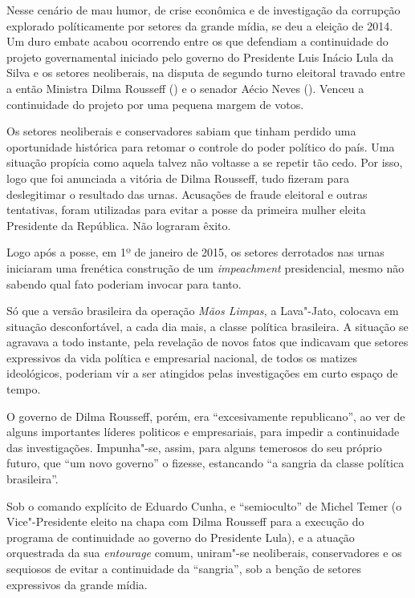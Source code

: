 Nesse cenário de mau humor, de crise econômica e de investigação da
corrupção explorado políticamente por setores da grande mídia, se deu a
eleição de 2014. Um duro embate acabou ocorrendo entre os que defendiam
a continuidade do projeto governamental iniciado pelo governo do
Presidente Luis Inácio Lula da Silva e os setores neoliberais, na
disputa de segundo turno eleitoral travado entre a então Ministra Dilma
Rousseff () e o senador Aécio Neves (). Venceu a continuidade do
projeto por uma pequena margem de votos.

Os setores neoliberais e conservadores sabiam que tinham perdido uma
oportunidade histórica para retomar o controle do poder político do
país. Uma situação propícia como aquela talvez não voltasse a se repetir
tão cedo. Por isso, logo que foi anunciada a vitória de Dilma Rousseff,
tudo fizeram para deslegitimar o resultado das urnas. Acusações de
fraude eleitoral e outras tentativas, foram utilizadas para evitar a
posse da primeira mulher eleita Presidente da República. Não lograram
êxito.

Logo após a posse, em 1º de janeiro de 2015, os setores derrotados nas
urnas iniciaram uma frenética construção de um \emph{impeachment}
presidencial, mesmo não sabendo qual fato poderiam invocar para tanto.

Só que a versão brasileira da operação \emph{Mãos Limpas,} a
Lava"-Jato, colocava em situação desconfortável, a cada dia
mais, a classe política brasileira. A situação se agravava a todo
instante, pela revelação de novos fatos que indicavam que setores
expressivos da vida política e empresarial nacional, de todos os matizes
ideológicos, poderiam vir a ser atingidos pelas investigações em curto
espaço de tempo.

O governo de Dilma Rousseff, porém, era ``excesivamente republicano'',
ao ver de alguns importantes líderes politicos e empresariais, para
impedir a continuidade das investigações. Impunha"-se, assim, para alguns
temerosos do seu próprio futuro, que ``um novo governo'' o
fizesse, estancando ``a sangria da classe política brasileira''.

Sob o comando explícito de Eduardo Cunha, e ``semioculto'' de Michel
Temer (o Vice"-Presidente eleito na chapa com Dilma Rousseff para a
execução do programa de continuidade ao governo do Presidente Lula), e a
atuação orquestrada da sua \emph{entourage} comum, uniram"-se
neoliberais, conservadores e os sequiosos de evitar a continuidade da
``sangria'', sob a benção de setores expressivos da grande mídia.

